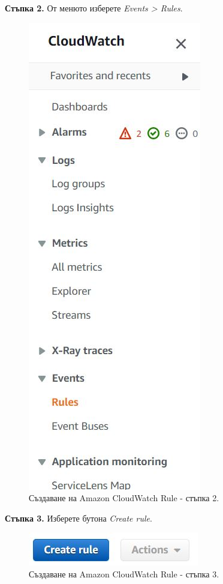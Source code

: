 \documentclass[12pt]{article}
\begin{document}
\noindent\textbf{Стъпка 2.} От менюто изберете \textit{Events > Rules}.
\begin{figure}[h!]
\centering
    \includegraphics[scale=0.55]{instructions/cloudwatch/2.JPG}
  \caption{Създаване на Amazon CloudWatch Rule - стъпка 2.}
\end{figure}

\noindent\textbf{Стъпка 3.} Изберете бутона \textit{Create rule}.
\begin{figure}[h!]
\centering
    \includegraphics[scale=0.6]{instructions/cloudwatch/3.JPG}
  \caption{Създаване на Amazon CloudWatch Rule - стъпка 3.}
\end{figure}
\end{document}
